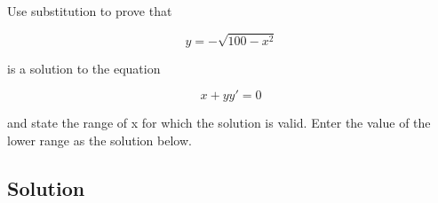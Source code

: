 Use substitution to prove that

\begin{equation}
    y = -\sqrt{100-x^2}
\end{equation}

is a solution to the equation

\begin{equation}
    x + y y' = 0
\end{equation}

and state the range of x for which the solution is valid. Enter the value of the lower range as the solution below.

\subsection*{Solution}
\six{}


\timebox

